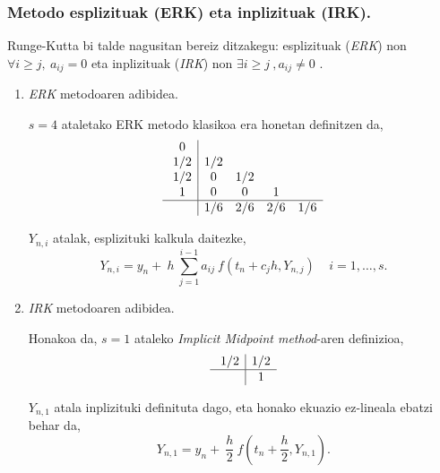 \subsubsection*{Metodo esplizituak (ERK) eta inplizituak (IRK).}
Runge-Kutta bi talde nagusitan bereiz ditzakegu: esplizituak (\emph {ERK}) non $\forall i\ge j, \ a_{ij}=0 $ eta inplizituak (\emph {IRK}) non $\exists i \ge j \ , a_{ij} \ne 0$ . 


\begin{enumerate}
\item \emph{ERK} metodoaren adibidea.

$s=4$ ataletako ERK metodo klasikoa era honetan definitzen da, 
\begin{equation*}
\begin{array}{c|cccc}
  \ 0   &    &    &     &      \\
  \ 1/2 & 1/2 &   &     &      \\
  \ 1/2 & 0   & 1/2  &  &      \\
  \ 1   & 0   & 0    &  1   &   \\
  \hline
  \     & 1/6 & 2/6  &  2/6 & 1/6 \\
  \end{array} \\
\end{equation*}

$Y_{n,i}$ atalak, esplizituki kalkula daitezke,
\begin{equation*}
Y_{n,i}=y_n+\ h\ \sum^{i-1}_{j=1}{a_{ij}\ f(t_n+c_jh,Y_{n,j})}\ \ \ \ \ i=1 ,\dots, s.
\end{equation*}  

\item \emph{IRK} metodoaren adibidea.

Honakoa da, $s=1$ ataleko \emph{Implicit Midpoint method}-aren definizioa, 
\begin{equation*}
\begin{array}{c|c}
  \ 1/2 &  1/2\\
  \hline
  \     & 1 \\
\end{array} \\
\end{equation*}

$Y_{n,1}$ atala inplizituki definituta dago, eta honako ekuazio ez-lineala ebatzi behar da,
\begin{equation*}
Y_{n,1}=y_n+\ \frac{h}{2} \ f(t_n+\frac{h}{2},Y_{n,1}).
\end{equation*} 

\end{enumerate}

